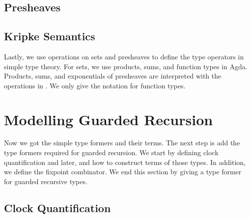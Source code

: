 \documentclass[a4paper,UKenglish,cleveref, autoref,numberwithinsect]{lipics-v2019}
\begin{document}
\subsection{Presheaves}
\label{sec:presheaves}














\subsection{Kripke Semantics}












Lastly, we use operations on sets and presheaves to define the type operators in simple type theory.
For sets, we use products, sums, and function types in Agda.
Products, sums, and exponentials of presheaves are interpreted with the operations in .
We only give the notation for function types.



\section{Modelling Guarded Recursion}
Now we got the simple type formers and their terms.
The next step is add the type formers required for guarded recursion.
We start by defining clock quantification and later, and how to construct terms of those types.
In addition, we define the fixpoint combinator.
We end this section by giving a type former for guarded recursive types.

\subsection{Clock Quantification}


\end{document}
